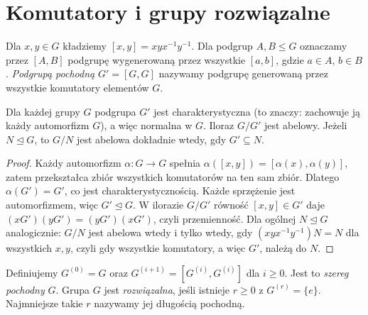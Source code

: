 \section{Komutatory i grupy rozwiązalne}
\begin{definicja}
\label{aa:def:pochodna}
Dla $x,y\in G$ kładziemy $[x,y]=xyx^{-1}y^{-1}$.
Dla podgrup $A,B\le G$ oznaczamy przez $[A,B]$ podgrupę
wygenerowaną przez wszystkie $[a,b]$, gdzie $a\in A$, $b\in B$.
\emph{Podgrupą pochodną} $G'=[G,G]$ nazywamy podgrupę
generowaną przez wszystkie komutatory elementów $G$.
\end{definicja}
\begin{lemat}
\label{aa:lem:derived-abelian}
Dla każdej grupy $G$ podgrupa $G'$ jest charakterystyczna
(to znaczy: zachowuje ją każdy automorfizm $G$),
a więc normalna w $G$. Iloraz $G/G'$ jest abelowy.
Jeżeli $N\trianglelefteq G$, to $G/N$ jest abelowa
dokładnie wtedy, gdy $G'\subseteq N$.
\end{lemat}
\begin{proof}
Każdy automorfizm $\alpha:G\to G$ spełnia
$\alpha([x,y])=[\alpha(x),\alpha(y)]$, zatem
przekształca zbiór wszystkich komutatorów na ten sam zbiór.
Dlatego $\alpha(G')=G'$, co jest charakterystycznością.
Każde sprzężenie jest automorfizmem, więc $G'\trianglelefteq G$.
W ilorazie $G/G'$ równość $[x,y]\in G'$ daje
$(xG')(yG')=(yG')(xG')$, czyli przemienność.
Dla ogólnej $N\trianglelefteq G$ analogicznie:
$G/N$ jest abelowa wtedy i tylko wtedy, gdy
$(xyx^{-1}y^{-1})N=N$ dla wszystkich $x,y$,
czyli gdy wszystkie komutatory, a więc $G'$, należą do $N$.
\end{proof}

\begin{definicja}
\label{aa:def:rozwiazalna}
Definiujemy $G^{(0)}=G$ oraz $G^{(i+1)}=[G^{(i)},G^{(i)}]$
dla $i\ge0$. Jest to \emph{szereg pochodny} $G$.
Grupa $G$ jest \emph{rozwiązalna}, jeśli istnieje $r\ge0$
z $G^{(r)}=\{e\}$.
Najmniejsze takie $r$ nazywamy jej długością pochodną.
\end{definicja}

